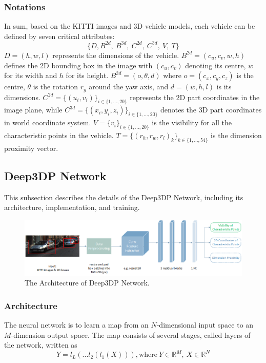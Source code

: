 \documentclass[a4paper,12pt]{article}
\begin{document}
\subsubsection{Notations}
In sum, based on the KITTI images and 3D vehicle models, each vehicle can be defined by seven critical attributes:
\[  \{D, B^{2d}, ~B^{3d}, ~C^{2d}, ~C^{3d}, ~V, ~T\}  \]
$D = (h, w, l)$ represents the dimensions of the vehicle. $B^{2d} = (c_u, c_v, w, h)$ defines the 2D bounding box in the image with $(c_u, c_v)$ denoting its centre,  $w$ for its width and $h$ for its height. $B^{3d} = (o, \theta, d)$ where $o = (c_x, c_y, c_z)$ is the centre, $\theta$ is the rotation $r_y$ around the yaw axis, and $d = (w, h, l)$ is its dimensions. $C^{2d}  = \{(u_i, v_i)\}_{i \in \{1, ...,20\}}$ represents the 2D part coordinates in the image plane, while $C^{3d}  = \{(x_i, y_i, z_i)\}_{i \in \{1, ...,20\}}$ denotes the 3D part coordinates in world coordinate system. $V = \{v_i\}_{i \in \{1, ...,20\}}$ is the visibility for all the characteristic points in the vehicle.  $T = \{{(r_{h},r_{w},r_{l})}_k\}_{k \in \{1, ...,54\}}$ is the dimension proximity vector.

\subsection{Deep3DP Network}
\label{network}
This subsection describes the details of the Deep3DP Network, including its architecture, implementation, and training.

\begin{figure}[h]		
	\includegraphics[width=1\textwidth]{NN_archi_box_0522.png}
	\caption{The Architecture of Deep3DP Network.}
	\centering
	\label{figure:nn_archi}
\end{figure}

\subsubsection{Architecture}
The neural network is to learn a map from an $N$-dimensional  input space to an $M$-dimension output space. The map consists of several stages, called layers of the network, written as
\begin{equation}
Y = l_L(...l_2(l_1(X))), \text{where} ~Y \in {\mathbb{R}^M}, ~X \in {\mathbb{R}^N}
\end{equation}
\end{document}

